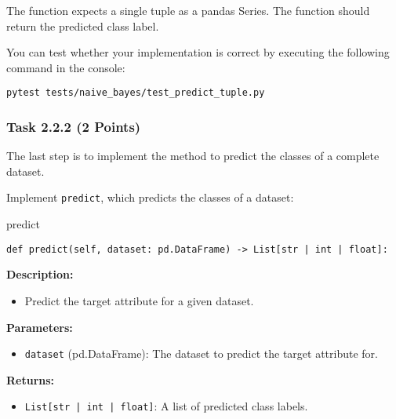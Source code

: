 \documentclass[
english,
smallborders
]{i6prcsht}
\newcommand{\points}[1]{\hfill \color{red}(#1 Points)\color{black}}
\begin{document}
\vspace*{0.5cm}

The function expects a single tuple as a pandas Series. The function should return the predicted class label.

You can test whether your implementation is correct by executing the following command in the console:

\vspace*{0.3cm}

\begin{lstlisting}
pytest tests/naive_bayes/test_predict_tuple.py
\end{lstlisting}

\newpage

\subsubsection*{Task 2.2.2 \points{2}}

The last step is to implement the method to predict the classes of a complete dataset.

Implement \texttt{predict}, which predicts the classes of a dataset:

\vspace*{0.3cm}

\begin{functionbox}{predict}
	\begin{lstlisting}[numbers=none]
def predict(self, dataset: pd.DataFrame) -> List[str | int | float]:
\end{lstlisting}
	
	\textbf{Description:}
	\begin{itemize}[leftmargin=*,topsep=0pt]
		\item Predict the target attribute for a given dataset.
	\end{itemize}
	
	\textbf{Parameters:}
	\begin{itemize}[leftmargin=*,topsep=0pt]
		\item \texttt{dataset} (pd.DataFrame): The dataset to predict the target attribute for.
	\end{itemize}
	
	\textbf{Returns:}
	\begin{itemize}[leftmargin=*,topsep=0pt]
		\item \texttt{List[str | int | float]}: A list of predicted class labels.
	\end{itemize}
\end{functionbox}
\end{document}
